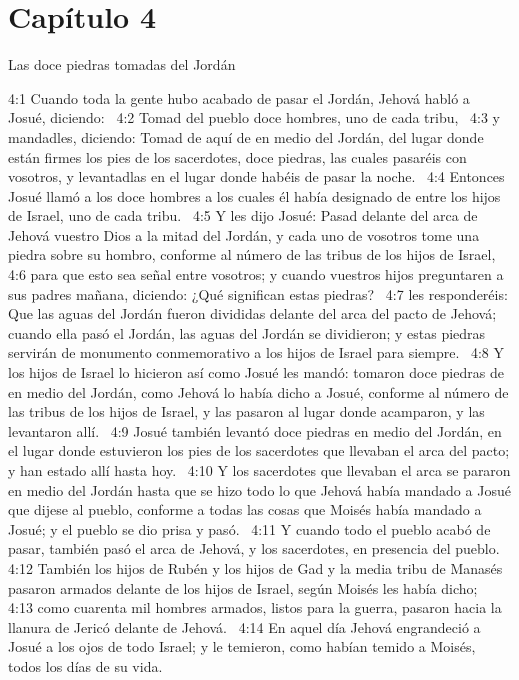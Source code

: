 \section*{Capítulo 4}
Las doce piedras tomadas del Jordán  

4:1 Cuando toda la gente hubo acabado de pasar el Jordán, Jehová habló a Josué, diciendo:  
4:2 Tomad del pueblo doce hombres, uno de cada tribu,  
4:3 y mandadles, diciendo: Tomad de aquí de en medio del Jordán, del lugar donde están firmes los pies de los sacerdotes, doce piedras, las cuales pasaréis con vosotros, y levantadlas en el lugar donde habéis de pasar la noche.  
4:4 Entonces Josué llamó a los doce hombres a los cuales él había designado de entre los hijos de Israel, uno de cada tribu.  
4:5 Y les dijo Josué: Pasad delante del arca de Jehová vuestro Dios a la mitad del Jordán, y cada uno de vosotros tome una piedra sobre su hombro, conforme al número de las tribus de los hijos de Israel,  
4:6 para que esto sea señal entre vosotros; y cuando vuestros hijos preguntaren a sus padres mañana, diciendo: ¿Qué significan estas piedras?  
4:7 les responderéis: Que las aguas del Jordán fueron divididas delante del arca del pacto de Jehová; cuando ella pasó el Jordán, las aguas del Jordán se dividieron; y estas piedras servirán de monumento conmemorativo a los hijos de Israel para siempre.  
4:8 Y los hijos de Israel lo hicieron así como Josué les mandó: tomaron doce piedras de en medio del Jordán, como Jehová lo había dicho a Josué, conforme al número de las tribus de los hijos de Israel, y las pasaron al lugar donde acamparon, y las levantaron allí.  
4:9 Josué también levantó doce piedras en medio del Jordán, en el lugar donde estuvieron los pies de los sacerdotes que llevaban el arca del pacto; y han estado allí hasta hoy.  
4:10 Y los sacerdotes que llevaban el arca se pararon en medio del Jordán hasta que se hizo todo lo que Jehová había mandado a Josué que dijese al pueblo, conforme a todas las cosas que Moisés había mandado a Josué; y el pueblo se dio prisa y pasó.  
4:11 Y cuando todo el pueblo acabó de pasar, también pasó el arca de Jehová, y los sacerdotes, en presencia del pueblo.  
4:12 También los hijos de Rubén y los hijos de Gad y la media tribu de Manasés pasaron armados delante de los hijos de Israel, según Moisés les había dicho;  
4:13 como cuarenta mil hombres armados, listos para la guerra, pasaron hacia la llanura de Jericó delante de Jehová.  
4:14 En aquel día Jehová engrandeció a Josué a los ojos de todo Israel; y le temieron, como habían temido a Moisés, todos los días de su vida.  
